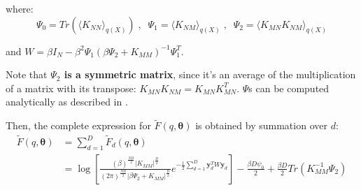\noindent where:
\begin{equation}
\label{psis}
\Psi_0 = Tr(\langle \mathit{K_{NN}} \rangle_{q(\mathit{X})}) \;, \;\;
\Psi_1 = \langle \mathit{K_{NM}} \rangle_{q(\mathit{X})} \;, \;\;
\Psi_2 = \langle \mathit{K_{MN}} \mathit{K_{NM}} \rangle_{q(\mathit{X})}
\end{equation}

\noindent and $W = \beta I_N - \beta^2 \Psi_1 (\beta \Psi_2 + K_{MM})^{-1} \Psi_1^T$. \newline

\par Note that \textbf{$\Psi_2$ is a symmetric matrix}, since it's an average of the multiplication of a matrix with its transpose: $K_{MN} K_{NM} = K_{MN} K_{MN}^T$.
$\Psi$s can be computed analytically as described in \cite{BayesianGPLVM}. 

Then, the complete expression for $\tilde{F}(q, \boldsymbol \theta)$ is obtained by summation over $d$:
\begin{align}
\tilde{F}(q, \boldsymbol \theta) &{} = \sum_{d=1}^D \tilde{F}_d(q, \boldsymbol \theta) \nonumber \\
   &{} = \log \left[ 
	\frac{(\beta)^{\frac{ND}{2}} \vert \mathit{K_{MM}} \vert ^\frac{D}{2} }
		 {(2\pi)^{\frac{ND}{2}} \vert \beta \Psi_2 + \mathit{K_{MM}}  \vert ^\frac{D}{2} } 
	 e^{-\frac{1}{2} \sum_{d=1}^D \mathbf{y}^{T}_{d} W \mathbf{y}_d}
	 \right]	 -
	 \frac{\beta D \psi_0}{2} + \frac{\beta D}{2} 
	 Tr \left( \mathit{K_{MM}^{-1}} \Psi_2 \right)	 \label{FFinal}
\end{align}






